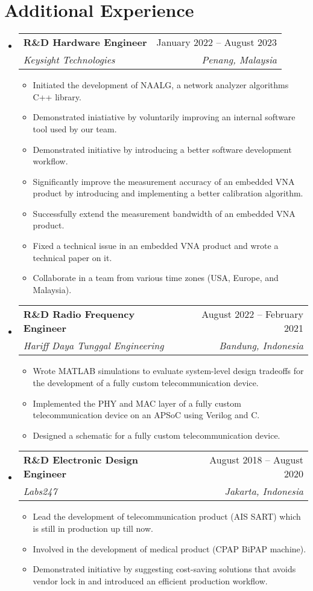 \documentclass[letterpaper,11pt]{article}
\makeatletter
\newcommand{\resumeItem}[1]{
  \item\small{
    {#1 \vspace{-2pt}}
  }
}
\newcommand{\resumeSubheading}[4]{
  \vspace{-2pt}\item
    \begin{tabular*}{0.97\textwidth}[t]{l@{\extracolsep{\fill}}r}
      \textbf{#1} & #2 \\
      \textit{\small#3} & \textit{\small #4} \\
    \end{tabular*}\vspace{-7pt}
}
\newcommand{\resumeSubHeadingListStart}{\begin{itemize}[leftmargin=0.15in, label={}]}
\newcommand{\resumeSubHeadingListEnd}{\end{itemize}}
\newcommand{\resumeItemListStart}{\begin{itemize}}
\newcommand{\resumeItemListEnd}{\end{itemize}\vspace{-5pt}}
\makeatother
\begin{document}
\section{Additional Experience}
\resumeSubHeadingListStart
\resumeSubheading
  {R\&D Hardware Engineer}{January 2022 -- August 2023}
  {Keysight Technologies}{Penang, Malaysia}
\resumeItemListStart
\resumeItem{Initiated the development of NAALG, a network analyzer algorithms
C++ library.}
\resumeItem{Demonstrated iniatiative by voluntarily improving an internal
software tool used by our team.}
\resumeItem{Demonstrated initiative by introducing a better software
development workflow.}
\resumeItem{Significantly improve the measurement accuracy of an embedded VNA
product by introducing and implementing a better calibration algorithm.}
\resumeItem{Successfully extend the measurement bandwidth of an embedded VNA
product.}
\resumeItem{Fixed a technical issue in an embedded VNA product and wrote a
technical paper on it.}
\resumeItem{Collaborate in a team from various time zones (USA, Europe, and
Malaysia).}
\resumeItemListEnd

\resumeSubheading
  {R\&D Radio Frequency Engineer}{August 2022 -- February 2021}
  {Hariff Daya Tunggal Engineering}{Bandung, Indonesia}
\resumeItemListStart
\resumeItem{Wrote MATLAB simulations to evaluate system-level design tradeoffs
for the development of a fully custom telecommunication device.}
\resumeItem{Implemented the PHY and MAC layer of a fully custom telecommunication
device on an APSoC using Verilog and C.}
\resumeItem{Designed a schematic for a fully custom telecommunication device.}
\resumeItemListEnd

\resumeSubheading
  {R\&D Electronic Design Engineer}{August 2018 -- August 2020}
  {Labs247}{Jakarta, Indonesia}
\resumeItemListStart
\resumeItem{Lead the development of telecommunication product (AIS SART) which
is still in production up till now.}
\resumeItem{Involved in the development of medical product (CPAP BiPAP
machine).}
\resumeItem{Demonstrated initiative by suggesting cost-saving solutions that
avoids vendor lock in and introduced an efficient production workflow.}
\resumeItemListEnd
\resumeSubHeadingListEnd

\end{document}

